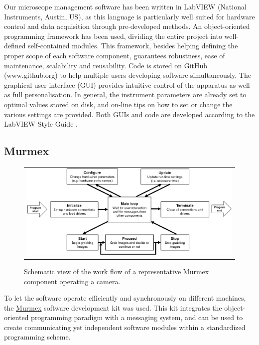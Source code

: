 \documentclass[12pt]{spieman}  %
\begin{document}
Our microscope management software has been written in LabVIEW (National Instruments, Austin, US), as this language is particularly well suited for hardware control and data acquisition through pre-developed methods. An object-oriented programming framework \cite{castagna1997object} has been used, dividing the entire project into well-defined self-contained modules. This framework, besides helping defining the proper scope of each software component, guarantees robustness, ease of maintenance, scalability and reusability. Code is stored on GitHub (www.github.org) to help multiple users developing software simultaneously. The graphical user interface (GUI) provides intuitive control of the apparatus as well as full personalisation. In general, the instrument parameters are already set to optimal values stored on disk, and on-line tips on how to set or change the various settings are provided. Both GUIs and code are developed according to the LabVIEW Style Guide \cite{LabviewStyle}.

\subsection{Murmex}

	\begin{figure}
   \begin{center}
   \begin{tabular}{c}
   \includegraphics[width=\textwidth]{murmex.eps}
   \end{tabular}
   \end{center}
   \caption{\label{fig:murmex} Schematic view of the work flow of a representative Murmex component operating a camera.} 
   \end{figure}

To let the software operate efficiently and synchronously on different machines, the \href{http://sine.ni.com/nips/cds/view/p/lang/en/nid/212895}{Murmex} software development kit was used. This kit integrates the object-oriented programming paradigm with a messaging system, and can be used to create communicating yet independent software modules within a standardized programming scheme.
\end{document}
